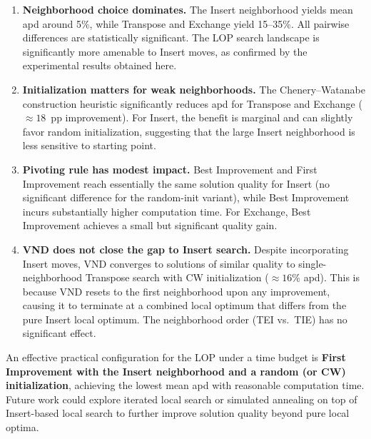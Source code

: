 \documentclass[11pt,a4paper]{article}
\begin{document}
\begin{enumerate}
  \item \textbf{Neighborhood choice dominates.}  The Insert neighborhood
        yields mean apd around 5\%, while Transpose and Exchange yield
        15--35\%.  All pairwise differences are statistically significant.
        The LOP search landscape is significantly more amenable to Insert
        moves, as confirmed by the experimental results obtained here.

  \item \textbf{Initialization matters for weak neighborhoods.}
        The Chenery--Watanabe construction heuristic significantly
        reduces apd for Transpose and Exchange ($\approx 18$~pp
        improvement).  For Insert, the benefit is marginal and can
        slightly favor random initialization, suggesting that the
        large Insert neighborhood is less sensitive to starting point.

  \item \textbf{Pivoting rule has modest impact.}
        Best Improvement and First Improvement reach essentially the
        same solution quality for Insert (no significant difference for
        the random-init variant), while Best Improvement incurs
        substantially higher computation time.  For Exchange, Best
        Improvement achieves a small but significant quality gain.

  \item \textbf{VND does not close the gap to Insert search.}
        Despite incorporating Insert moves, VND converges to solutions
        of similar quality to single-neighborhood Transpose search with
        CW initialization ($\approx 16\%$ apd).  This is because VND
        resets to the first neighborhood upon any improvement, causing
        it to terminate at a combined local optimum that differs from
        the pure Insert local optimum.  The neighborhood order (TEI
        vs.\ TIE) has no significant effect.
\end{enumerate}

An effective practical configuration for the LOP under a time budget
is \textbf{First Improvement with the Insert neighborhood and a random
(or CW) initialization}, achieving the lowest mean apd with reasonable
computation time.  Future work could explore iterated local search or
simulated annealing on top of Insert-based local search to further
improve solution quality beyond pure local optima.
\end{document}
